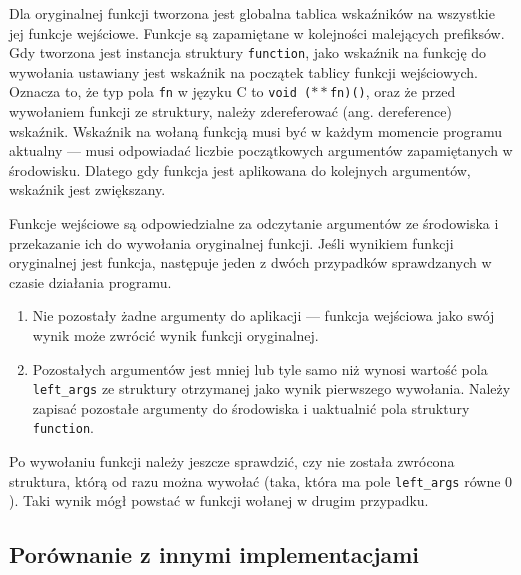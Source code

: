 \documentclass[declaration,shortabstract]{iithesis}
\begin{document}
Dla oryginalnej funkcji tworzona jest globalna tablica wskaźników na wszystkie 
jej funkcje wejściowe. Funkcje są zapamiętane w kolejności malejących prefiksów.
Gdy tworzona jest instancja struktury \texttt{function}, jako wskaźnik na 
funkcję do wywołania ustawiany jest wskaźnik na początek tablicy funkcji 
wejściowych. Oznacza to, że typ pola \texttt{fn} w języku C to 
\texttt{void ($\ast\ast$fn)()}, oraz że przed wywołaniem funkcji ze struktury,
należy zdereferować (ang. dereference) wskaźnik. Wskaźnik na wołaną funkcją 
musi być w każdym momencie programu aktualny --- musi odpowiadać liczbie 
początkowych argumentów zapamiętanych w środowisku. Dlatego gdy 
funkcja jest aplikowana do kolejnych argumentów, wskaźnik jest zwiększany. 


Funkcje wejściowe są odpowiedzialne za odczytanie argumentów ze środowiska i 
przekazanie ich do wywołania oryginalnej funkcji. Jeśli wynikiem funkcji 
oryginalnej jest funkcja, następuje jeden z dwóch przypadków sprawdzanych w
czasie działania programu.

\begin{enumerate}
  \item Nie pozostały żadne argumenty do aplikacji ---
  funkcja wejściowa jako swój wynik może zwrócić wynik funkcji oryginalnej.
  \item Pozostałych argumentów jest mniej lub tyle samo niż wynosi 
  wartość pola \texttt{left\_args} ze struktury otrzymanej jako wynik 
  pierwszego wywołania.
  Należy zapisać pozostałe argumenty do środowiska i uaktualnić pola struktury 
  \texttt{function}.
\end{enumerate}

Po wywołaniu funkcji należy jeszcze sprawdzić, czy nie została zwrócona 
struktura, którą od razu można wywołać 
(taka, która ma pole \texttt{left\_args} 
równe $0$). Taki wynik mógł powstać w funkcji wołanej w drugim przypadku.

\subsection{Porównanie z innymi implementacjami}
\end{document}
